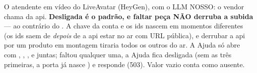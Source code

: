 O atendente em vídeo do LiveAvatar (HeyGen), com o LLM NOSSO: o vendor chama
 da api. \textbf{Desligada é o padrão, e
faltar peça NÃO derruba a subida} --- ao contrário do . A chave da
conta e os ids nascem em momentos diferentes (os ids saem de
 \emph{depois} de a api estar no ar com URL
pública), e derrubar a api por um produto em montagem tiraria todos os outros do
ar. A Ajuda só abre com ,
, ,
 e  juntas; faltou qualquer
uma, a Ajuda fica desligada (sem as três primeiras, a porta já nasce
) e  responde
 (503). Valor vazio conta como ausente.

